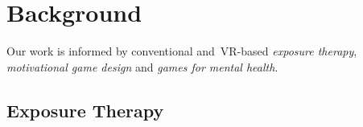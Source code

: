 
\section{Background}
\label{sec:background}
Our work is informed by conventional and~\ac{VR}-based \textit{exposure therapy}, \textit{motivational game design} and \textit{games for mental health}. %

\subsection{Exposure Therapy}

